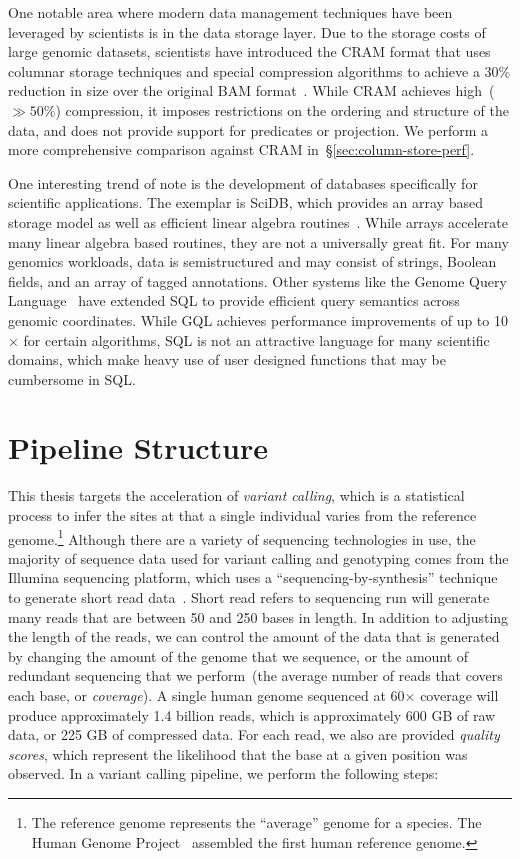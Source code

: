 \documentclass[masters]{ucbthesis}
\begin{document}
One notable area where modern data management techniques have been leveraged by scientists is in
the data storage layer. Due to the storage costs of large genomic datasets, scientists have introduced the
CRAM format that uses columnar storage techniques and special compression algorithms to achieve a
30\% reduction in size over the original BAM format~\cite{fritz11}. While CRAM achieves high~($\gg
50\%$) compression, it imposes restrictions on the ordering and structure of the data, and does not
provide support for predicates or projection. We perform a more comprehensive comparison against
CRAM in~\S\ref{sec:column-store-perf}.

One interesting trend of note is the development of databases specifically for scientific applications.
The exemplar is SciDB, which provides an array based storage model as well as efficient
linear algebra routines~\cite{brown10}. While arrays accelerate many linear algebra based routines, they
are not a universally great fit. For many genomics workloads, data is semistructured and may consist of
strings, Boolean fields, and an array of tagged annotations. Other systems like the Genome Query
Language~\cite{kozanitis14} have extended SQL to provide efficient query semantics across genomic
coordinates. While GQL achieves performance improvements of up to 10$\times$ for certain algorithms,
SQL is not an attractive language for many scientific domains, which make heavy use of user designed
functions that may be cumbersome in SQL.

\section{Pipeline Structure}
\label{sec:genomics-pipeline}

This thesis targets the acceleration of \emph{variant calling}, which is a statistical process to infer the
sites at that a single individual varies from the reference genome.\footnote{The reference genome
represents the ``average'' genome for a species. The Human Genome Project~\cite{lander01} assembled
the first human reference genome.} Although there are a variety of sequencing technologies in use, the
majority of sequence data used for variant calling and genotyping comes from the Illumina sequencing
platform, which uses a ``sequencing-by-synthesis'' technique to generate short read
data~\cite{metzker09}. Short read refers to 
sequencing run will generate many reads that are between 50 and 250 bases in length. In addition to
adjusting the length of the reads, we can control the amount of the data that is generated by
changing the amount of the genome that we sequence, or the amount of redundant sequencing that
we perform~(the average number of reads that covers each base, or \emph{coverage}). A single
human genome sequenced at 60$\times$ coverage will produce approximately 1.4 billion reads,
which is approximately 600 GB of raw data, or 225 GB of compressed data. For each read, we also
are provided \emph{quality scores}, which represent the likelihood that the base at a given position
was observed. In a variant calling pipeline, we perform the following steps:
\end{document}
